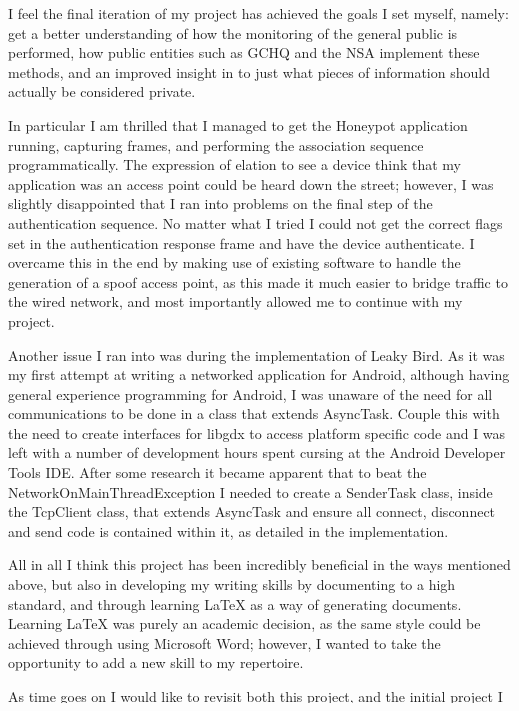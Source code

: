 I feel the final iteration of my project has achieved the goals I set myself, namely: get a better understanding of how the monitoring of the general public is performed, how public entities such as GCHQ and the NSA implement these methods, and an improved insight in to just what pieces of information should actually be considered private.

In particular I am thrilled that I managed to get the Honeypot application running, capturing frames, and performing the association sequence programmatically. The expression of elation to see a device think that my application was an access point could be heard down the street; however, I was slightly disappointed that I ran into problems on the final step of the authentication sequence. No matter what I tried I could not get the correct flags set in the authentication response frame and have the device authenticate. I overcame this in the end by making use of existing software to handle the generation of a spoof access point, as this made it much easier to bridge traffic to the wired network, and most importantly allowed me to continue with my project.

Another issue I ran into was during the implementation of Leaky Bird. As it was my first attempt at writing a networked application for Android, although having general experience programming for Android, I was unaware of the need for all communications to be done in a class that extends AsyncTask. Couple this with the need to create interfaces for libgdx to access platform specific code and I was left with a number of development hours spent cursing at the Android Developer Tools IDE. After some research it became apparent that to beat the NetworkOnMainThreadException I needed to create a SenderTask class, inside the TcpClient class, that extends AsyncTask and ensure all connect, disconnect and send code is contained within it, as detailed in the implementation.

All in all I think this project has been incredibly beneficial in the ways mentioned above, but also in developing my writing skills by documenting to a high standard, and through learning LaTeX as a way of generating documents. Learning LaTeX was purely an academic decision, as the same style could be achieved through using Microsoft Word; however, I wanted to take the opportunity to add a new skill to my repertoire. 

As time goes on I would like to revisit both this project, and the initial project I set out to complete. Wireless network security is a field that I have become increasingly interested in during this past year, and putting the honeypot application on a Raspberry Pi, with a GPS/GSM shield, attaching it to a quadcopter, and flying it around sounds like too much of a fun opportunity to pass up.


\clearpage
